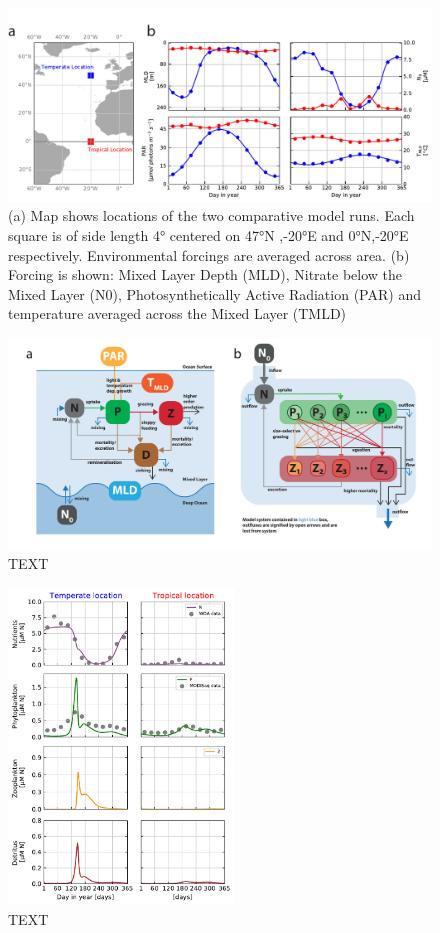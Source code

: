 \documentclass[journal abbreviation, manuscript]{copernicus}
\begin{document}
\begin{figure}[t]
\includegraphics[width=15cm]{Figures/firstdraft_plots/01_forcing_labeled.pdf}
\caption{(a) Map shows locations of the two comparative model runs. Each square is of side length 4° centered on 47°N ,-20°E and 0°N,-20°E respectively. Environmental forcings are averaged across area. (b) Forcing is shown: Mixed Layer Depth (MLD), Nitrate below the Mixed Layer (N0),
Photosynthetically Active Radiation (PAR) and temperature averaged across the Mixed Layer (TMLD)}
\label{phydraforcing}
\end{figure}



\begin{figure}[t]
\includegraphics[width=15cm]{Figures/firstdraft_schematics/02__schematics_NPZDandChemostat.pdf}
\caption{TEXT}
\label{phydraschematics_1}
\end{figure}


\begin{figure}[t]
\includegraphics[width=6cm]{Figures/firstdraft_plots/02_NPZDslab.pdf}
\caption{TEXT}
\end{figure}
\end{document}
